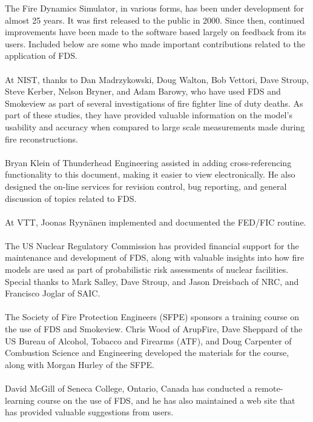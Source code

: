 \documentclass[11pt]{book}
\begin{document}
The Fire Dynamics Simulator, in various forms, has been under development for almost 25 years. It was
first released to the public in 2000. Since then, continued improvements
have been made to the software based largely on feedback from its users.
Included below are some who made important contributions related to the application of FDS. \\
\\
\noindent At NIST, thanks to Dan Madrzykowski, Doug Walton, Bob Vettori, Dave Stroup, Steve Kerber, Nelson Bryner, and Adam Barowy,
who have used FDS and Smokeview as part of several investigations of fire fighter line of duty deaths.
As part of these studies, they have provided valuable information on the model's usability and accuracy
when compared to large scale measurements made during fire reconstructions.\\
\\
\noindent Bryan Klein of Thunderhead Engineering assisted in adding cross-referencing functionality to this document, making it easier to
view electronically. He also designed the on-line services for revision control, bug reporting, and general discussion of topics related to FDS. \\
\\
\noindent At VTT, Joonas Ryyn\"{a}nen implemented and documented the FED/FIC routine. \\
\\
\noindent The US Nuclear Regulatory Commission has provided financial support for the maintenance and development of FDS,
along with valuable insights into how fire models are used as part of probabilistic risk assessments of nuclear
facilities. Special thanks to Mark Salley, Dave Stroup, and Jason Dreisbach of NRC, and Francisco Joglar of SAIC.\\
\\
\noindent The Society of Fire Protection Engineers (SFPE) sponsors a training course on the use of FDS and Smokeview.
Chris Wood of ArupFire, Dave Sheppard of the US Bureau of Alcohol, Tobacco and Firearms (ATF), and
Doug Carpenter of Combustion Science and Engineering developed the materials for the course, along with
Morgan Hurley of the SFPE.\\
\\
\noindent David McGill of Seneca College, Ontario, Canada has conducted a remote-learning course
on the use of FDS, and he has also maintained a web site that has provided valuable suggestions from users.\\
\\
\end{document}
